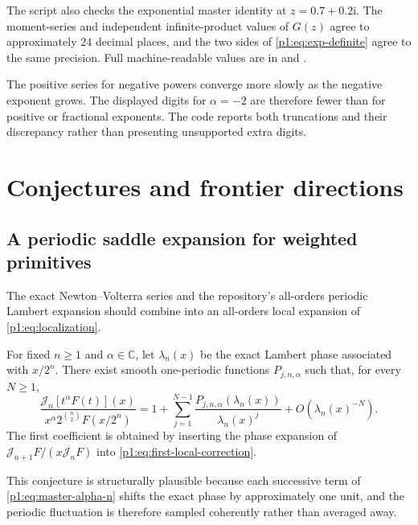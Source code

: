 \documentclass[11pt,oneside]{article}
\theoremstyle{definition}
\theoremstyle{remark}
\newcommand{\C}{\mathbb C}
\newcommand{\ii}{\mathrm i}
\newcommand{\Jn}{\mathcal J}
\newcommand{\1}{\mathbf 1}
\begin{document}
The script also checks the exponential master identity at
\(z=0.7+0.2\ii\).  The moment-series and independent infinite-product values
of \(G(z)\) agree to approximately \(24\) decimal places, and the two sides of
\eqref{p1:eq:exp-definite} agree to the same precision.  Full machine-readable
values are in  and
.

\begin{warningbox}
The positive series for negative powers converge more slowly as the negative
exponent grows.  The displayed digits for \(\alpha=-2\) are therefore fewer
than for positive or fractional exponents.  The code reports both truncations
and their discrepancy rather than presenting unsupported extra digits.
\end{warningbox}

\section{Conjectures and frontier directions}
\label{p1:sec:conjectures}

\subsection{A periodic saddle expansion for weighted primitives}
The exact Newton--Volterra series and the repository's all-orders periodic
Lambert expansion should combine into an all-orders local expansion of
\eqref{p1:eq:localization}.

\begin{conjecture}\label{p1:conj:weighted-saddle}
For fixed \(n\geq1\) and \(\alpha\in\C\), let \(\lambda_n(x)\) be the exact
Lambert phase associated with \(x/2^n\).  There exist smooth one-periodic
functions \(P_{j,n,\alpha}\) such that, for every \(N\geq1\),
\begin{equation}
 \frac{\Jn_n[t^\alpha F(t)](x)}
 {x^\alpha2^{\binom n2}F(x/2^n)}
 =1+\sum_{j=1}^{N-1}
 \frac{P_{j,n,\alpha}(\lambda_n(x))}{\lambda_n(x)^j}
 +O(\lambda_n(x)^{-N}).                                       \label{p1:eq:conj-weighted-saddle}
\end{equation}
The first coefficient is obtained by inserting the phase expansion of
\(\Jn_{n+1}F/(x\Jn_nF)\) into \eqref{p1:eq:first-local-correction}.
\end{conjecture}

This conjecture is structurally plausible because each successive term of
\eqref{p1:eq:master-alpha-n} shifts the exact phase by approximately one unit,
and the periodic fluctuation is therefore sampled coherently rather than
averaged away.
\end{document}
